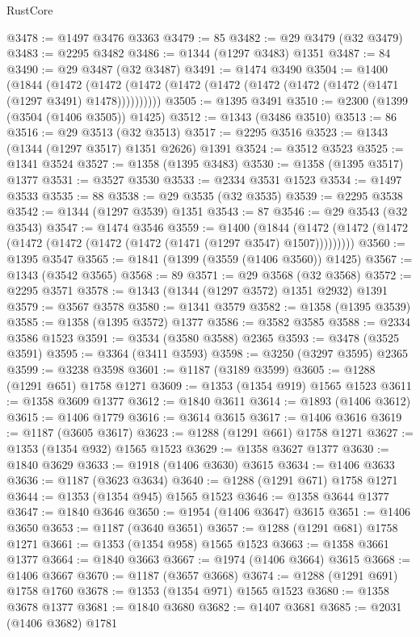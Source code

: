 \begin{lexlean}{RustCore}
\begin{coremodule}
@3478 := @1497 @3476 @3363
@3479 := 85
@3482 := @29 @3479 (@32 @3479)
@3483 := @2295 @3482
@3486 := @1344 (@1297 @3483) @1351
@3487 := 84
@3490 := @29 @3487 (@32 @3487)
@3491 := @1474 @3490
@3504 := @1400
    (@1844
      (@1472 (@1472 (@1472 (@1472 (@1472 (@1472 (@1472 (@1472 (@1471 (@1297 @3491) @1478))))))))))
@3505 := @1395 @3491
@3510 := @2300 (@1399 (@3504 (@1406 @3505)) @1425)
@3512 := @1343 (@3486 @3510)
@3513 := 86
@3516 := @29 @3513 (@32 @3513)
@3517 := @2295 @3516
@3523 := @1343 (@1344 (@1297 @3517) @1351 @2626) @1391
@3524 := @3512 @3523
@3525 := @1341 @3524
@3527 := @1358 (@1395 @3483)
@3530 := @1358 (@1395 @3517) @1377
@3531 := @3527 @3530
@3533 := @2334 @3531 @1523
@3534 := @1497 @3533
@3535 := 88
@3538 := @29 @3535 (@32 @3535)
@3539 := @2295 @3538
@3542 := @1344 (@1297 @3539) @1351
@3543 := 87
@3546 := @29 @3543 (@32 @3543)
@3547 := @1474 @3546
@3559 := @1400
    (@1844 (@1472 (@1472 (@1472 (@1472 (@1472 (@1472 (@1472 (@1471 (@1297 @3547) @1507)))))))))
@3560 := @1395 @3547
@3565 := @1841 (@1399 (@3559 (@1406 @3560)) @1425)
@3567 := @1343 (@3542 @3565)
@3568 := 89
@3571 := @29 @3568 (@32 @3568)
@3572 := @2295 @3571
@3578 := @1343 (@1344 (@1297 @3572) @1351 @2932) @1391
@3579 := @3567 @3578
@3580 := @1341 @3579
@3582 := @1358 (@1395 @3539)
@3585 := @1358 (@1395 @3572) @1377
@3586 := @3582 @3585
@3588 := @2334 @3586 @1523
@3591 := @3534 (@3580 @3588) @2365
@3593 := @3478 (@3525 @3591)
@3595 := @3364 (@3411 @3593)
@3598 := @3250 (@3297 @3595) @2365
@3599 := @3238 @3598
@3601 := @1187 (@3189 @3599)
@3605 := @1288 (@1291 @651) @1758 @1271
@3609 := @1353 (@1354 @919) @1565 @1523
@3611 := @1358 @3609 @1377
@3612 := @1840 @3611
@3614 := @1893 (@1406 @3612)
@3615 := @1406 @1779
@3616 := @3614 @3615
@3617 := @1406 @3616
@3619 := @1187 (@3605 @3617)
@3623 := @1288 (@1291 @661) @1758 @1271
@3627 := @1353 (@1354 @932) @1565 @1523
@3629 := @1358 @3627 @1377
@3630 := @1840 @3629
@3633 := @1918 (@1406 @3630) @3615
@3634 := @1406 @3633
@3636 := @1187 (@3623 @3634)
@3640 := @1288 (@1291 @671) @1758 @1271
@3644 := @1353 (@1354 @945) @1565 @1523
@3646 := @1358 @3644 @1377
@3647 := @1840 @3646
@3650 := @1954 (@1406 @3647) @3615
@3651 := @1406 @3650
@3653 := @1187 (@3640 @3651)
@3657 := @1288 (@1291 @681) @1758 @1271
@3661 := @1353 (@1354 @958) @1565 @1523
@3663 := @1358 @3661 @1377
@3664 := @1840 @3663
@3667 := @1974 (@1406 @3664) @3615
@3668 := @1406 @3667
@3670 := @1187 (@3657 @3668)
@3674 := @1288 (@1291 @691) @1758 @1760
@3678 := @1353 (@1354 @971) @1565 @1523
@3680 := @1358 @3678 @1377
@3681 := @1840 @3680
@3682 := @1407 @3681
@3685 := @2031 (@1406 @3682) @1781

\end{coremodule}
\end{lexlean}
